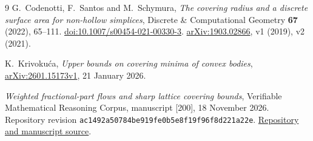 \documentclass[11pt,a4paper]{article}
\theoremstyle{remark}
\begin{document}
\begin{thebibliography}{9}
G.~Codenotti, F.~Santos and M.~Schymura,
\emph{The covering radius and a discrete surface area for non-hollow
simplices}, Discrete \& Computational Geometry \textbf{67} (2022),
65--111. \href{https://doi.org/10.1007/s00454-021-00330-3}
{doi:10.1007/s00454-021-00330-3}.
\href{https://arxiv.org/abs/1903.02866}{arXiv:1903.02866},
v1 (2019), v2 (2021).

K.~Krivoku\'ca, \emph{Upper bounds on covering minima of convex bodies},
\href{https://arxiv.org/abs/2601.15173}{arXiv:2601.15173v1},
21 January 2026.

\emph{Weighted fractional-part flows and sharp lattice covering bounds},
Verifiable Mathematical Reasoning Corpus, manuscript [200],
18 November 2026. Repository revision
\texttt{ac1492a50784be919fe0b5e8f19f96f8d221a22e}.
\href{https://github.com/QEEDDD/Verifiable-Mathematical-Reasoning-Corpus}
{Repository and manuscript source}.
\end{thebibliography}
\end{document}

